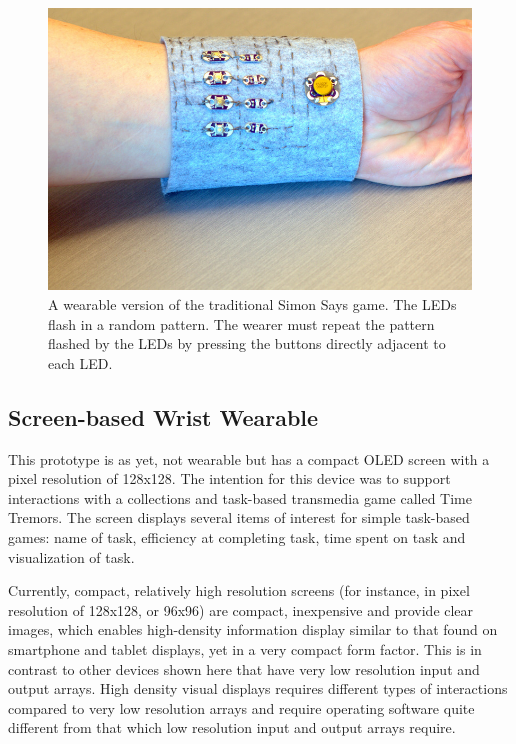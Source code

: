 \documentclass{chi-ext}
\begin{document}
\begin{figure}
  \begin{center}
  \includegraphics[width=\columnwidth]{images/P1130375.jpg}
  \caption{A wearable version of the traditional Simon Says game. The LEDs flash in a random pattern. The wearer must repeat the pattern flashed by the LEDs by pressing the buttons directly adjacent to each LED.}
  \label{fig:marginparsample}
  \end{center}  
\end{figure}

\subsection{Screen-based Wrist Wearable}
This prototype is as yet, not wearable but has a compact OLED screen with a pixel  resolution of 128x128. The intention for this device was to support interactions with a collections and task-based transmedia game called Time Tremors. The screen displays several items of interest for simple task-based games: name of task, efficiency at completing task, time spent on task and visualization of task.

Currently, compact, relatively high resolution screens (for instance, in pixel resolution of 128x128, or 96x96) are compact, inexpensive and provide clear images, which enables high-density information display similar to that found on smartphone and tablet displays, yet in a very compact form factor. This is in contrast to other devices shown here that have very low resolution input and output arrays. High density visual displays requires different types of interactions compared to very low resolution arrays and require operating software quite different from that which low resolution input and output arrays require.
\end{document}
